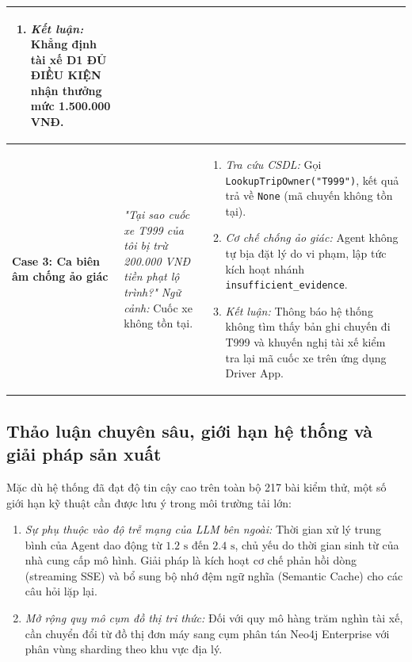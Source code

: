 \documentclass[a4paper,11pt]{article}
\begin{document}
\begin{table}[htbp]
\begin{tabularx}{\textwidth}{>{\raggedright\arraybackslash}p{2.2cm}>{\raggedright\arraybackslash}p{3.8cm}>{\raggedright\arraybackslash}X}
\begin{enumerate}[noitemsep,leftmargin=1.2em]
    \item \textit{Kết luận:} Khẳng định tài xế D1 ĐỦ ĐIỀU KIỆN nhận thưởng mức 1.500.000 VNĐ.
\end{enumerate} \\
\midrule
\textbf{Case 3: Ca biên âm chống ảo giác} 
& \textit{"Tại sao cuốc xe T999 của tôi bị trừ 200.000 VNĐ tiền phạt lộ trình?"}\newline
\textit{Ngữ cảnh:} Cuốc xe không tồn tại.
& \begin{enumerate}[noitemsep,leftmargin=1.2em]
    \item \textit{Tra cứu CSDL:} Gọi \texttt{LookupTripOwner("T999")}, kết quả trả về \texttt{None} (mã chuyến không tồn tại).
    \item \textit{Cơ chế chống ảo giác:} Agent không tự bịa đặt lý do vi phạm, lập tức kích hoạt nhánh \nolinkurl{insufficient_evidence}.
    \item \textit{Kết luận:} Thông báo hệ thống không tìm thấy bản ghi chuyến đi T999 và khuyến nghị tài xế kiểm tra lại mã cuốc xe trên ứng dụng Driver App.
\end{enumerate} \\
\bottomrule
\end{tabularx}
\end{table}

\subsection{Thảo luận chuyên sâu, giới hạn hệ thống và giải pháp sản xuất}
\label{sec:discussion}
Mặc dù hệ thống đã đạt độ tin cậy cao trên toàn bộ 217 bài kiểm thử, một số giới hạn kỹ thuật cần được lưu ý trong môi trường tải lớn:
\begin{enumerate}[leftmargin=1.5em,noitemsep]
    \item \textit{Sự phụ thuộc vào độ trễ mạng của LLM bên ngoài:} Thời gian xử lý trung bình của Agent dao động từ $1.2\text{ s}$ đến $2.4\text{ s}$, chủ yếu do thời gian sinh từ của nhà cung cấp mô hình. Giải pháp là kích hoạt cơ chế phản hồi dòng (streaming SSE) và bổ sung bộ nhớ đệm ngữ nghĩa (Semantic Cache) cho các câu hỏi lặp lại.
    \item \textit{Mở rộng quy mô cụm đồ thị tri thức:} Đối với quy mô hàng trăm nghìn tài xế, cần chuyển đổi từ đồ thị đơn máy sang cụm phân tán Neo4j Enterprise với phân vùng sharding theo khu vực địa lý.
\end{enumerate}

\clearpage
\end{document}
